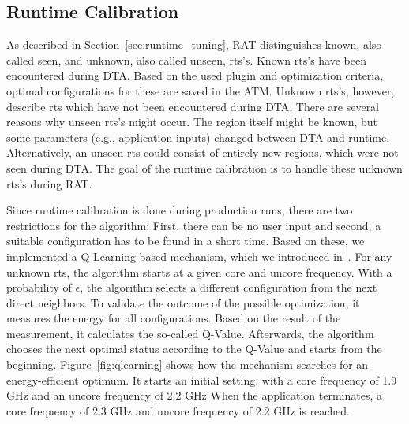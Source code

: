 \subsection{Runtime Calibration} \label{sec:calibration}

As described in Section~\ref{sec:runtime_tuning}, RAT distinguishes known, also called seen, and unknown, also called unseen, rts's.
Known rts's have been encountered during DTA.
Based on the used plugin and optimization criteria, optimal configurations for these are saved in the ATM.
Unknown rts's, however, describe rts which have not been encountered during DTA.
There are several reasons why unseen rts's might occur.
The region itself might be known, but some parameters (e.g., application inputs) changed between DTA and runtime.
Alternatively, an unseen rts could consist of entirely new regions, which were not seen during DTA.
The goal of the runtime calibration is to handle these unknown rts's during RAT.

Since runtime calibration is done during production runs, there are two restrictions for the algorithm:
First, there can be no user input and second, a suitable configuration has to be found in a short time.
Based on these, we implemented a Q-Learning based mechanism, which we introduced in~\cite{Gocht2019a}.
For any unknown rts, the algorithm starts at a given core and uncore frequency.
With a probability of {$\epsilon$}, the algorithm selects a different configuration from the next direct neighbors.
To validate the outcome of the possible optimization, it measures the energy for all configurations.
Based on the result of the measurement, it calculates the so-called Q-Value.
Afterwards, the algorithm chooses the next optimal status according to the Q-Value and starts from the beginning.
Figure~\ref{fig:qlearning} shows how the mechanism searches for an energy-efficient optimum.
It starts an initial setting, with a core frequency of 1.9 GHz and an uncore frequency of 2.2 GHz
When the application terminates, a core frequency of 2.3 GHz and uncore frequency of 2.2 GHz is reached.

